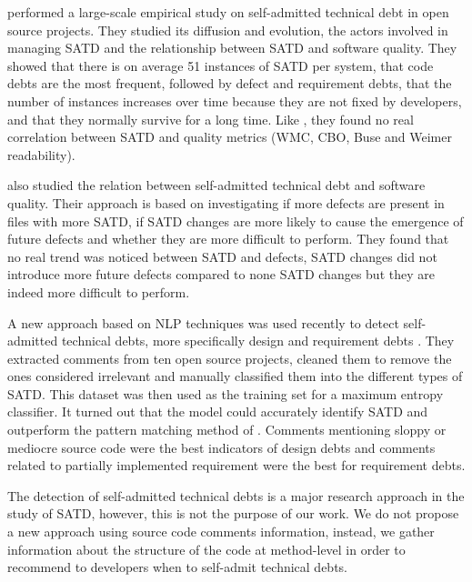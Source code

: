 \citet{BavotaR16} performed a large-scale empirical study on self-admitted technical debt in open source projects. They studied its diffusion and evolution, the actors involved in managing \ac{SATD} and the relationship between \ac{SATD} and software quality. They showed that there is on average 51 instances of \ac{SATD} per system, that code debts are the most frequent, followed by defect and requirement debts, that the number of instances increases over time because they are not fixed by developers, and that they normally survive for a long time. Like \citet{griffith2014correspondence}, they found no real correlation between \ac{SATD} and quality metrics (\ac{WMC}, \ac{CBO}, Buse and Weimer readability). \par

\citet{wehaibi2016examining} also studied the relation between self-admitted technical debt and software quality. Their approach is based on investigating if more defects are present in files with more \ac{SATD}, if \ac{SATD} changes are more likely to cause the emergence of future defects and whether they are more difficult to perform. They found that no real trend was noticed between \ac{SATD} and defects, \ac{SATD} changes did not introduce more future defects compared to none \ac{SATD} changes but they are indeed more difficult to perform. \par

A new approach based on \ac{NLP} techniques was used recently to detect self-admitted technical debts, more specifically design and requirement debts \citep{MaldonadoNLP}. They extracted comments from ten open source projects, cleaned them to remove the ones considered irrelevant and manually classified them into the different types of \ac{SATD}. This dataset was then used as the training set for a maximum entropy classifier. It turned out that the model could accurately identify \ac{SATD} and outperform the pattern matching method of \citet{PotdarS14}. Comments mentioning sloppy or mediocre source code were the best indicators of design debts and comments related to partially implemented requirement were the best for requirement debts. \par

The detection of self-admitted technical debts is a major research approach in the study of \ac{SATD}, however, this is not the purpose of our work. We do not propose a new approach using source code comments information, instead, we gather information about the structure of the code at method-level in order to recommend to developers when to self-admit technical debts. \par

